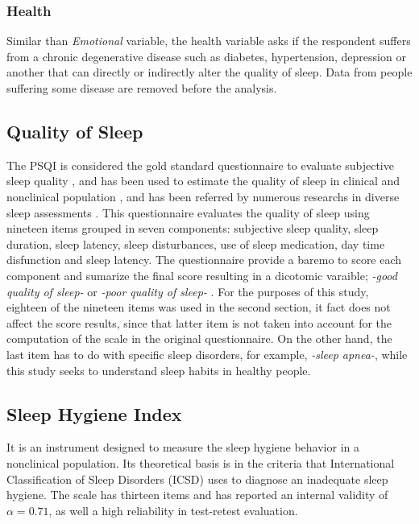 \documentclass[]{book}
\begin{document}
\subsubsection{Health}\label{health}

Similar than \emph{Emotional} variable, the health variable asks if the
respondent suffers from a chronic degenerative disease such as diabetes,
hypertension, depression or another that can directly or indirectly
alter the quality of sleep. Data from people suffering some disease are
removed before the analysis.

\subsection{Quality of Sleep}\label{quality-of-sleep}

The PSQI is considered the gold standard questionnaire to evaluate
subjective sleep quality \citep{Cameron2010}, and has been used to
estimate the quality of sleep in clinical and nonclinical population
\citep{mastin2006}, and has been referred by numerous researchs in
diverse sleep assessments \citep{bai2012}. This questionnaire evaluates
the quality of sleep using nineteen items grouped in seven components:
subjective sleep quality, sleep duration, sleep latency, sleep
disturbances, use of sleep medication, day time disfunction and sleep
latency. The questionnaire provide a baremo to score each component and
sumarize the final score resulting in a dicotomic varaible; \emph{-good
quality of sleep-} or \emph{-poor quality of sleep-} \citep{psqi1989}.
For the purposes of this study, eighteen of the nineteen items was used
in the second section, it fact does not affect the score results, since
that latter item is not taken into account for the computation of the
scale in the original questionnaire. On the other hand, the last item
has to do with specific sleep disorders, for example, \emph{-sleep
apnea-}, while this study seeks to understand sleep habits in healthy
people.

\subsection{Sleep Hygiene Index}\label{sleep-hygiene-index}

It is an instrument designed to measure the sleep hygiene behavior in a
nonclinical population. Its theoretical basis is in the criteria that
International Classification of Sleep Disorders (ICSD) uses to diagnose
an inadequate sleep hygiene. The scale has thirteen items and has
reported an internal validity of \(\alpha=0.71\), as well a high
reliability in test-retest evaluation\citep{mastin2006}.
\end{document}
